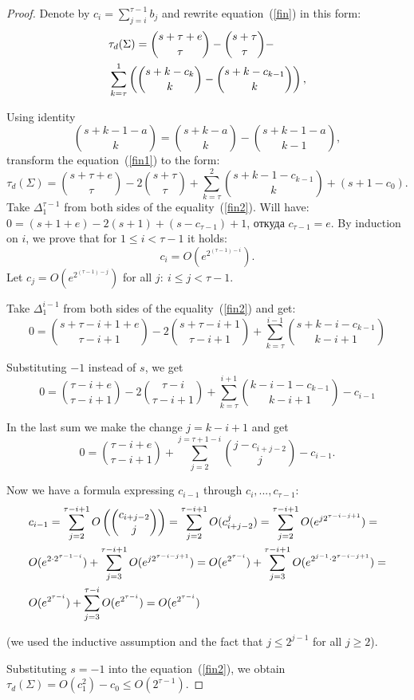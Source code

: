\documentclass[a4paper,reqno,12pt]{amsart}
\theoremstyle{plain}
\theoremstyle{remark}
\theoremstyle{definition}
\renewcommand{\le}{\leqslant}
\renewcommand{\ge}{\geqslant}
\begin{document}
\begin{proof}
Denote by $c_i= \sum_{j = i} ^ {\tau-1} b_j$
and rewrite
equation~(\ref{fin})
in this form:
\begin{align}\label{fin1}
&\tau_d(\Sigma)=\binom{s+\tau+e}{\tau}-\binom{s+\tau}{\tau}-   \\
&\sum_{k=\tau}^{1}
\left(\binom{s+k-c_k
}{k}-\binom{s+k-c_{k-1}
}{k}\right), \notag
\end{align}

Using identity
$$
\binom{s+k-1-a}{k}=\binom{s+k-a}{k}-\binom{s+k-1-a}{k-1},
$$
transform the equation~(\ref{fin1}) to the form:
\begin{equation}\label{fin2} 
\tau_d(\Sigma)=\binom{s+\tau+e}{\tau}-2\binom{s+\tau}{\tau}+   
\sum_{k=\tau}^{2}
\binom{s+k-1-c_{k-1}}{k}
+(s+1-c_0).
\end{equation}
Take $\Delta_1^{\tau-1}$ from both sides of the equality~(\ref{fin2}).
Will have:
$0=(s+1+e)-2(s+1)+(s-c_{\tau-1})+1$, откуда $c_{\tau-1}=e$.
By induction on $i$, we prove that for $1\le i <\tau-1$
it holds: 
$$c_i=O(e^{2^{(\tau-1)-i}}).$$
Let  $c_j=O(e^{2^{(\tau-1)-j}})$ 
for all
 $j:\ i\le j<\tau-1$.

Take $\Delta_1^{i-1}$ from both sides of the equality~(\ref{fin2}) 
and get:
$$
0
=\binom{s+\tau-i+1+e}{\tau-i+1}-2\binom{s+\tau-i+1}{\tau-i+1}+\sum_{k=\tau}^{i-1}\binom{s+k-i-c_{k-1}}{k-i+1}
$$


Substituting $-1$ instead of $s$,
we get
$$
0=\binom{\tau-i+e}{\tau-i+1}-2\binom{\tau-i}{\tau-i+1}+\sum_{k=\tau}^{i+1}\binom{k-i-1-c_{k-1}}{k-i+1} -c_{i-1}
$$

In the last sum we make the change $j= k-i + 1$ and get
$$
0=\binom{\tau-i+e}{\tau-i+1}+\sum^{j=\tau+1-i}_{j=2}\binom{j-c_{i+j-2}}{j} -c_{i-1}.
$$

Now we have a formula expressing
$c_{i-1}$ through $c_{i}, ..., c_{\tau-1}$:
\begin{align}
& 
c_{i-1}= \sum_{j=2}^{\tau-i+1}O\left(\binom{c_{i+j-2}}{j}\right) = 
\sum_{j=2}^{\tau-i+1}O(c_{i+j-2}^j)= 
\sum_{j=2}^{\tau-i+1}O(e^{j2^{\tau-i-j+1}})=
\notag\\
&
O(e^{2\cdot2^{\tau-1-i}})+ \sum_{j=3}^{\tau-i+1}O(e^{j2^{\tau-i-j+1}}) = 
O(e^{2^{\tau-i}})+\sum_{j=3}^{\tau-i+1}O(e^{2^{j-1}\cdot2^{\tau-i-j+1}})  = \notag \\
& 
O(e^{2^{\tau-i}})+\sum_{j=3}^{\tau-i}O(e^{2^{\tau-i}})= 
O(e^{2^{\tau-i}})
\notag
\end{align}

(we used the inductive assumption
and the fact that $j\le2^{j-1}$ for all $j \ge 2$).

Substituting $s = -1$ into the equation~(\ref{fin2}), we obtain
$
\tau_d(\Sigma)=O(c_1^2)-c_0\le O(2^{\tau-1})$.
\end{proof}
\end{document}
